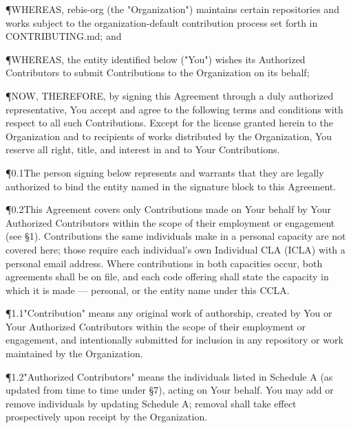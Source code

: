 



\setupagreement
{}


\P{}{WHEREAS, rebis-org (the "Organization") maintains certain repositories and works subject to the organization-default contribution process set forth in CONTRIBUTING.md; and}

\P{}{WHEREAS, the entity identified below ("You") wishes its Authorized Contributors to submit Contributions to the Organization on its behalf;}

\P{}{NOW, THEREFORE, by signing this Agreement through a duly authorized representative, You accept and agree to the following terms and conditions with respect to all such Contributions. Except for the license granted herein to the Organization and to recipients of works distributed by the Organization, You reserve all right, title, and interest in and to Your Contributions.}


\P{0.1}{The person signing below represents and warrants that they are legally authorized to bind the entity named in the signature block to this Agreement.}

\P{0.2}{This Agreement covers only Contributions made on Your behalf by Your Authorized Contributors within the scope of their employment or engagement (see \S1). Contributions the same individuals make in a personal capacity are not covered here; those require each individual's own Individual CLA (ICLA) with a personal email address. Where contributions in both capacities occur, both agreements shall be on file, and each code offering shall state the capacity in which it is made --- personal, or the entity name under this CCLA.}


\P{1.1}{"Contribution" means any original work of authorship, created by You or Your Authorized Contributors within the scope of their employment or engagement, and intentionally submitted for inclusion in any repository or work maintained by the Organization.}

\P{1.2}{"Authorized Contributors" means the individuals listed in Schedule A (as updated from time to time under \S7), acting on Your behalf. You may add or remove individuals by updating Schedule A; removal shall take effect prospectively upon receipt by the Organization.}


